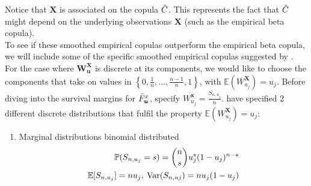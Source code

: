\documentclass[12pt]{report}
\newcommand{\1}{\mathbf{1}}
\begin{document}
\begin{flushleft}
Notice that $\boldsymbol{X}$ is associated on the copula $\Tilde{C}$. This represents the fact that $\Tilde{C}$ might depend on the underlying observations $\boldsymbol{X}$ (such as the empirical beta copula). \\
\vspace{0.5cm}
To see if these smoothed empirical copulas outperform the empirical beta copula, we will include some of the specific smoothed empirical copulas suggested by \cite{KojadinovicYi2024Smooth}. For the case where $\boldsymbol{W^{X}_{u}}$ is discrete at its components, we would like to choose the components that take on values in $\left\{0, \frac{1}{n}, \dots, \frac{n-1}{n}, 1 \right\}$, with $\mathbb{E}(W^{\boldsymbol{X}}_{u_{j}}) = u_{j}$. Before diving into the survival margins for $\Bar{F}^{x}_{\boldsymbol{u}}$, specify $W_{u_{j}}^{\boldsymbol{x}} = \frac{S_{n,u_{j}}}{n}$. \cite{KojadinovicYi2024Smooth} have specified 2 different discrete distributions that fulfil the property $\mathbb{E}(W^{\boldsymbol{X}}_{u_{j}}) = u_{j}$:

\begin{enumerate}

\item Marginal distributions binomial distributed
\begin{align*}
\mathbb{P} ( S_{n,u_{j}} = s) = \dbinom{n}{s} u_{j}^{s} (1 - u_{j}) ^ {n - s} \\
\mathbb{E}[S_{n,u_{j}}] = n u_{j}, \: \mathrm{Var}(S_{n,u{j}}) = n u_{j} (1 - u_{j})
\end{align*}


\end{enumerate}
\end{flushleft}
\end{document}
